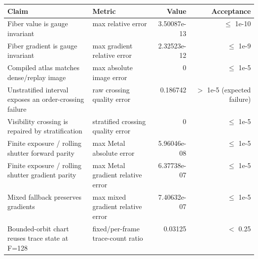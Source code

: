 \begin{tabular}{p{0.34\linewidth}p{0.25\linewidth}rr}
\toprule
Claim & Metric & Value & Acceptance \\
\midrule
Fiber value is gauge invariant & max relative error & 3.50087e-13 & $\leq$ 1e-10 \\
Fiber gradient is gauge invariant & max gradient relative error & 2.32523e-12 & $\leq$ 1e-9 \\
Compiled atlas matches dense/replay image & max absolute image error & 0 & $\leq$ 1e-5 \\
Unstratified interval exposes an order-crossing failure & raw crossing quality error & 0.186742 & $>$ 1e-5 (expected failure) \\
Visibility crossing is repaired by stratification & stratified crossing quality error & 0 & $\leq$ 1e-5 \\
Finite exposure / rolling shutter forward parity & max Metal absolute error & 5.96046e-08 & $\leq$ 1e-5 \\
Finite exposure / rolling shutter gradient parity & max Metal gradient relative error & 6.37738e-07 & $\leq$ 1e-5 \\
Mixed fallback preserves gradients & max mixed gradient relative error & 7.40632e-07 & $\leq$ 1e-5 \\
Bounded-orbit chart reuses trace state at F=128 & fixed/per-frame trace-count ratio & 0.03125 & $<$ 0.25 \\
\bottomrule
\end{tabular}
